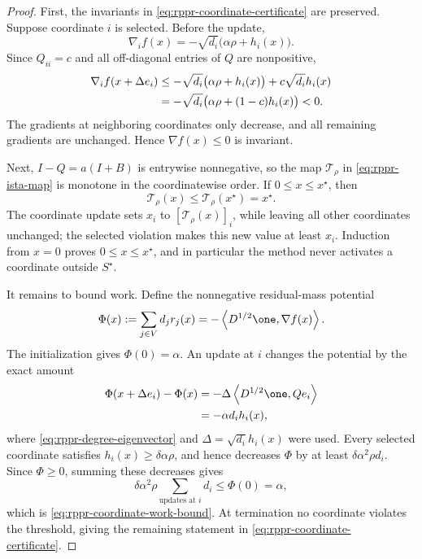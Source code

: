 \begin{proof}
First, the invariants in \cref{eq:rppr-coordinate-certificate} are preserved.
Suppose coordinate \(i\) is selected.  Before the update,
\[
    \nabla_i f(x)
    =-\sqrt{d_i}\bigl(\alpha\rho+h_i(x)\bigr).
\]
Since \(Q_{ii}=c\) and all off-diagonal entries of \(Q\) are nonpositive,
\begin{align}
    \nabla_i f(x+\Delta e_i)
    &\leq
    -\sqrt{d_i}\bigl(\alpha\rho+h_i(x)\bigr)
    +c\sqrt{d_i}h_i(x) \notag\\
    &=-\sqrt{d_i}
       \bigl(\alpha\rho+(1-c)h_i(x)\bigr)<0.
    \label{eq:rppr-coordinate-gradient-invariant}
\end{align}
The gradients at neighboring coordinates only decrease, and all remaining
gradients are unchanged.  Hence \(\nabla f(x)\leq0\) is invariant.

Next, \(I-Q=a(I+B)\) is entrywise nonnegative, so the map
\(\mathcal{T}_\rho\) in \cref{eq:rppr-ista-map} is monotone in the
coordinatewise order.  If \(0\leq x\leq x^\star\), then
\[
    \mathcal{T}_\rho(x)
    \leq\mathcal{T}_\rho(x^\star)=x^\star.
\]
The coordinate update sets
\(x_i\) to \([\mathcal{T}_\rho(x)]_i\), while leaving all other coordinates
unchanged; the selected violation makes this new value at least \(x_i\).
Induction from \(x=0\) proves \(0\leq x\leq x^\star\), and in particular the
method never activates a coordinate outside \(S^\star\).

It remains to bound work.  Define the nonnegative residual-mass potential
\begin{equation}
    \Phi(x)
    :=\sum_{j\in V}d_jr_j(x)
    =-\left\langle D^{1/2}\one,\nabla f(x)\right\rangle.
    \label{eq:rppr-coordinate-potential}
\end{equation}
The initialization gives \(\Phi(0)=\alpha\).  An update at \(i\) changes the
potential by the exact amount
\begin{align}
    \Phi(x+\Delta e_i)-\Phi(x)
    &=-\Delta\left\langle D^{1/2}\one,Qe_i\right\rangle \notag\\
    &=-\alpha d_i h_i(x),
    \label{eq:rppr-coordinate-potential-drop}
\end{align}
where \cref{eq:rppr-degree-eigenvector} and
\(\Delta=\sqrt{d_i}h_i(x)\) were used.  Every selected coordinate satisfies
\(h_i(x)\geq\delta\alpha\rho\), and hence decreases \(\Phi\) by at least
\(\delta\alpha^2\rho d_i\).  Since \(\Phi\geq0\), summing these decreases
gives
\[
    \delta\alpha^2\rho
    \sum_{\text{updates at }i}d_i
    \leq\Phi(0)=\alpha,
\]
which is \cref{eq:rppr-coordinate-work-bound}.  At termination no coordinate
violates the threshold, giving the remaining statement in
\cref{eq:rppr-coordinate-certificate}.
\end{proof}


